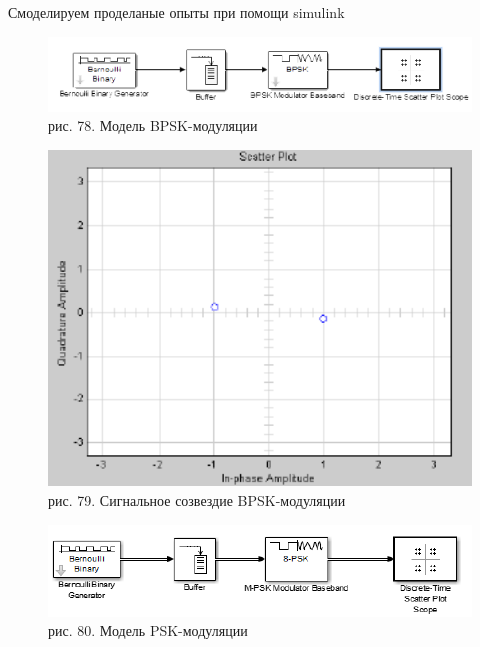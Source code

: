 \documentclass[10pt,a4paper]{report}
\begin{document}
Смоделируем проделаные опыты при помощи simulink
\begin{figure}
\begin{center}
\includegraphics[width=150mm, scale = 0.9]{9_21}\newline
рис. 78. Модель BPSK-модуляции\newline
\end{center}
\end{figure}
\begin{figure}
\begin{center}
\includegraphics[width=150mm, scale = 0.9]{9_22}\newline
рис. 79. Сигнальное созвездие BPSK-модуляции\newline
\end{center}
\end{figure}
\begin{figure}
\begin{center}
\includegraphics[width=150mm, scale = 0.9]{9_23}\newline
рис. 80. Модель PSK-модуляции\newline
\end{center}
\end{figure}
\end{document}
